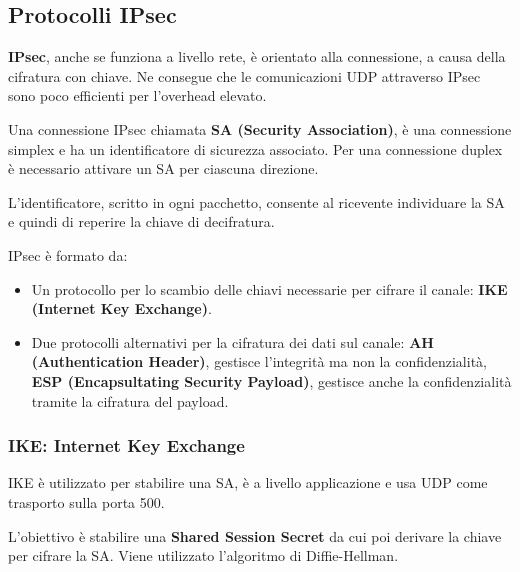     \subsection{Protocolli IPsec}
        \textbf{IPsec}, anche se funziona a livello rete, è orientato alla connessione, a causa della cifratura con chiave. Ne consegue che le comunicazioni UDP attraverso IPsec sono poco efficienti per l'overhead elevato.
    
        Una connessione IPsec chiamata \textbf{SA (Security Association)}, è una connessione simplex e ha un identificatore di sicurezza associato. Per una connessione duplex è necessario attivare un SA per ciascuna direzione.
    
        L'identificatore, scritto in ogni pacchetto, consente al ricevente individuare la SA e quindi di reperire la chiave di decifratura.
    
        IPsec è formato da:
        \begin{itemize}
            \item Un protocollo per lo scambio delle chiavi necessarie per cifrare il canale: \textbf{IKE (Internet Key Exchange)}.
            \item Due protocolli alternativi per la cifratura dei dati sul canale: \textbf{AH (Authentication
            Header)}, gestisce l'integrità ma non la confidenzialità, \textbf{ESP (Encapsultating Security Payload)}, gestisce anche la confidenzialità tramite la cifratura del payload.
        \end{itemize}

        \subsubsection{IKE: Internet Key Exchange}
            IKE è utilizzato per stabilire una SA, è a livello applicazione e usa UDP come trasporto sulla porta 500.
        
            L'obiettivo è stabilire una \textbf{Shared Session Secret} da cui poi derivare la chiave per cifrare la SA. Viene utilizzato l'algoritmo di Diffie-Hellman.

